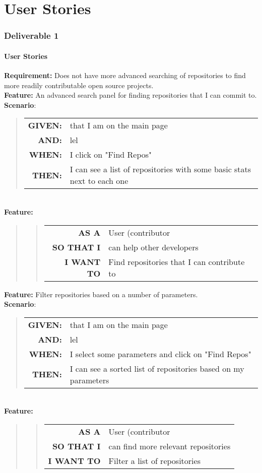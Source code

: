 \documentclass[12pt]{article}
\newcommand{\Requirement}[1] {
   \noindent \textbf{Requirement:} #1
}
\newcommand{\Feature}[1]{ 
   \noindent \textbf{Feature:} #1
}
\newcommand{\FeatureC}[4]{ 
	\begin{quote}
	\begin{tabular}{rl}
	\textbf{AS A} & #1\\
	\textbf{SO THAT \uppercase{#2}} & #3\\
	\textbf{\uppercase{#2} WANT TO} & #4  
	\end{tabular}
	\end{quote}
}
\newcommand{\GivenSc} {
	\noindent \textbf{GIVEN:}
	}
\newcommand{\WhenSc} {
	\noindent \textbf{WHEN:}
	}
\newcommand{\AndSc} {
	\noindent \textbf{AND:}
	}
\newcommand{\ThenSc} {
	\noindent \textbf{THEN:}
	}
\begin{document}


\pagebreak
\setcounter{part}{1}
\setcounter{section}{1}
\setcounter{subsection}{0}
\part{User Stories}
\section*{Deliverable 1}
\subsection{User Stories}

\begin{framed}
\Requirement{Does not have more advanced searching of repositories to find more readily contributable open source projects.}\\[0.2cm]
\Feature{An advanced search panel for finding repositories that I can commit to.}\\[0.4cm]
\noindent \textbf{Scenario}:
\begin{quote}
\begin{tabular}{rl}
\GivenSc & that I am on the main page\\
\AndSc & lel\\
\WhenSc & I click on "Find Repos"\\
\ThenSc & I can see a list of repositories with some basic stats next to each one
\end{tabular}
\end{quote}
~\\
\Feature{}
\begin{quote}
\FeatureC{User (contributor}{I}{can help other developers}{Find repositories that I can contribute to}
\end{quote}

\Feature{Filter repositories based on a number of parameters.}\\[0.4cm]
\noindent \textbf{Scenario}:
\begin{quote}
\begin{tabular}{rl}
\GivenSc & that I am on the main page\\
\AndSc & lel\\
\WhenSc & I select some parameters and click on "Find Repos"\\
\ThenSc & I can see a sorted list of repositories based on my parameters
\end{tabular}
\end{quote}
~\\
\Feature{}
\begin{quote}
\FeatureC{User (contributor}{I}{can find more relevant repositories}{Filter a list of repositories}
\end{quote}
\
\end{framed}
\end{document}
